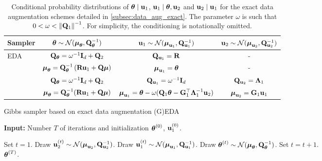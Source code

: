 \documentclass[nohypdvips,onefignum,onetabnum]{siamart171218}
\begin{document}
\begin{table}
{\scriptsize
  \caption{Conditional probability distributions of $\boldsymbol{\theta} \mid \mathbf{u}_1$, $\mathbf{u}_1\mid\boldsymbol{\theta},\mathbf{u}_2$ and $\mathbf{u}_2\mid\mathbf{u}_1$ for the exact data augmentation schemes detailed in \cref{subsec:data_aug_exact}. The parameter $\omega$ is such that $0 < \omega < \left\|\mathbf{Q}_1\right\|^{-1}$.
  For simplicity, the conditioning is notationally omitted.}
  \label{table:exact_DA}
  \begin{center}
   {\renewcommand{\arraystretch}{2}
    \begin{tabular}{|l|c|c|c|} 
      \hline
      \textbf{Sampler} & $\boldsymbol{\theta} \sim \mathcal{N}(\boldsymbol{\mu}_{\boldsymbol{\theta}},\mathbf{Q}_{\boldsymbol{\theta}}^{-1})$ & $\mathbf{u}_1 \sim \mathcal{N}(\boldsymbol{\mu}_{\mathbf{u}_1},\mathbf{Q}_{\mathbf{u}_1}^{-1})$ & $\mathbf{u}_2  \sim \mathcal{N}(\boldsymbol{\mu}_{\mathbf{u}_2},\mathbf{Q}_{\mathbf{u}_2}^{-1})$ \\
      \hline 
      \multirow{3}{*}{EDA} & $\mathbf{Q}_{\boldsymbol{\theta}} = \omega^{-1}\mathbf{I}_d + \mathbf{Q}_2$ & $\mathbf{Q}_{\mathbf{u}_1} = \mathbf{R}$ & - \\
      & $\boldsymbol{\mu}_{\boldsymbol{\theta}} = \mathbf{Q}_{\boldsymbol{\theta}}^{-1}\left(\mathbf{R}\mathbf{u}_1 + \mathbf{Q}\boldsymbol{\mu}\right)$ & $\boldsymbol{\mu}_{\mathbf{u}_1} = \boldsymbol{\theta}$ & - \\[0.3em]
      \hline
      \multirow{3}{*}{GEDA} 
      & $\mathbf{Q}_{\boldsymbol{\theta}} = \omega^{-1}\mathbf{I}_d + \mathbf{Q}_2$ 
      & $\mathbf{Q}_{\mathbf{u}_1} = \omega^{-1}\mathbf{I}_d$ & $\mathbf{Q}_{\mathbf{u}_2} = \mathbf{\Lambda}_1$ \\
      & $\boldsymbol{\mu}_{\boldsymbol{\theta}} = \mathbf{Q}_{\boldsymbol{\theta}}^{-1}(\mathbf{R}\mathbf{u}_1 + \mathbf{Q}\boldsymbol{\mu})$ 
      & $\boldsymbol{\mu}_{\mathbf{u}_1} = \boldsymbol{\theta} - \omega(\mathbf{Q}_1\boldsymbol{\theta} -\mathbf{G}_1^{\top}\mathbf{\Lambda}_1^{-1}\mathbf{u}_2)$ & $\boldsymbol{\mu}_{\mathbf{u}_2} = \mathbf{G}_1\mathbf{u}_1$ \\[0.3em]
      \hline
    \end{tabular}}
  \end{center}
}
\end{table}
%
\begin{algorithm}
\caption{Gibbs sampler based on exact data augmentation (G)EDA}
\label{algo:exact_DA}
\hspace*{\algorithmicindent} \textbf{Input:} Number $T$ of iterations and initialization $\boldsymbol{\theta}^{(0)}$, $\mathbf{u}_1^{(0)}$.
\begin{algorithmic}[1]
\State Set $t = 1$.
  \State Draw $\mathbf{u}_2^{(t)} \sim \mathcal{N}(\boldsymbol{\mu}_{\mathbf{u}_2},\mathbf{Q}_{\mathbf{u}_2}^{-1})$. \Comment{\textcolor{green}{Only if GEDA is considered.}}
  \State Draw $\mathbf{u}_1^{(t)} \sim \mathcal{N}(\boldsymbol{\mu}_{\mathbf{u}_1},\mathbf{Q}_{\mathbf{u}_1}^{-1})$.
  \State Draw $\boldsymbol{\theta}^{(t)} \sim \mathcal{N}(\boldsymbol{\mu}_{\boldsymbol{\theta}},\mathbf{Q}_{\boldsymbol{\theta}}^{-1})$.
  \State Set $t = t + 1$.
\EndWhile\\
\Return $\boldsymbol{\theta}^{(T)}$.
\end{algorithmic}
\end{algorithm}
\end{document}
